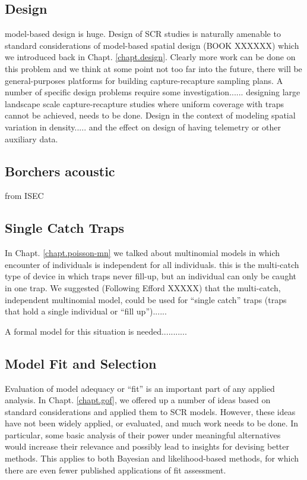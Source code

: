 \subsection{Design}

model-based design is huge. Design of SCR studies is naturally
amenable to standard considerations of model-based spatial design
(BOOK XXXXXX) which we introduced back in
Chapt. \ref{chapt.design}. Clearly more work can be done on this
problem and we think at some point not too far into the future, there
will be general-purposes platforms for building capture-recapture
sampling plans. 
A number of specific design problems require some
investigation...... designing large landscape scale capture-recapture
studies where uniform coverage with traps cannot be achieved, needs
to be done.  
Design in the context of modeling spatial variation in
density..... and the effect on design of having telemetry or other
auxiliary data. 


\subsection{Borchers acoustic}

from ISEC

\subsection{Single Catch Traps}

In Chapt. \ref{chapt.poisson-mn} we talked about multinomial models in
which encounter of individuals is independent for all
individuals. this is 
the multi-catch type of device in which traps never fill-up, but an
individual can only be caught in one trap. 
We suggested (Following Efford XXXXX) that the multi-catch,
independent multinomial model, could be used for ``single catch''
traps (traps that hold a single individual or ``fill up'')......

A formal model for this situation is needed...........

\subsection{Model Fit and Selection}

Evaluation of model adequacy or ``fit'' is an important part of any
applied analysis. In Chapt. \ref{chapt.gof}, we offered up a number of
ideas based on standard considerations and applied them to SCR
models.  However, these ideas have not been widely applied, or evaluated, and much
work needs to be done. In particular, some basic analysis of their
power under meaningful alternatives would increase their relevance and
possibly lead to insights for devising better methods. This applies to
both Bayesian and likelihood-based methods, for which there are even
fewer published applications of fit assessment.

